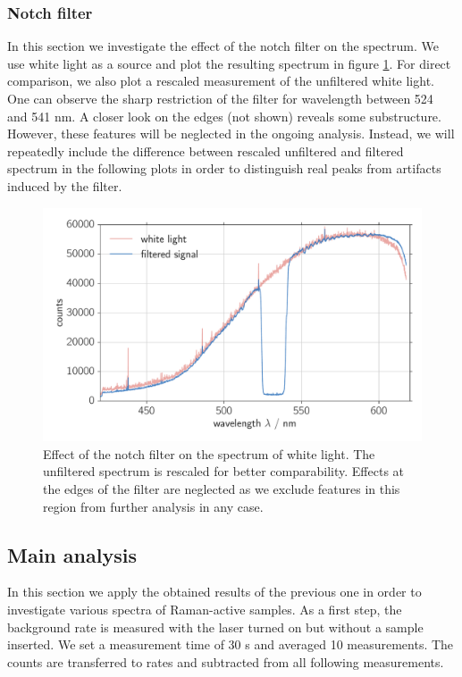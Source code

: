 \subsubsection{Notch filter}
In this section we investigate the effect of the notch filter on the spectrum. We use white light as a source and 
plot the resulting spectrum in figure \ref{fig:ccd_notch_filter}. For direct comparison, we also plot a rescaled 
measurement of the unfiltered white light. One can observe the sharp restriction of the filter for wavelength 
between 524 and 541 nm. A closer look on the edges (not shown) reveals some substructure. However, these features 
will be neglected in the ongoing analysis. Instead, we will repeatedly include the difference between rescaled 
unfiltered and filtered spectrum in the following plots in order to distinguish real peaks from artifacts induced 
by the filter. 

\begin{figure}[htpb]
    \centering
    \includegraphics[width=0.8\linewidth]{analysis/figures/ccd_notch_filter}
    \caption{Effect of the notch filter on the spectrum of white light. The unfiltered spectrum is rescaled for 
    better comparability. Effects at the edges of the filter are neglected as we exclude features in this region
    from further analysis in any case.}
    \label{fig:ccd_notch_filter}
\end{figure}

\subsection{Main analysis}
In this section we apply the obtained results of the previous one in order to investigate various spectra of 
Raman-active samples. As a first step, the background rate is measured with the laser turned on but without
a sample inserted. We set a measurement time of 30 s and averaged 10 measurements. The counts are transferred 
to rates and subtracted from all following measurements. 

